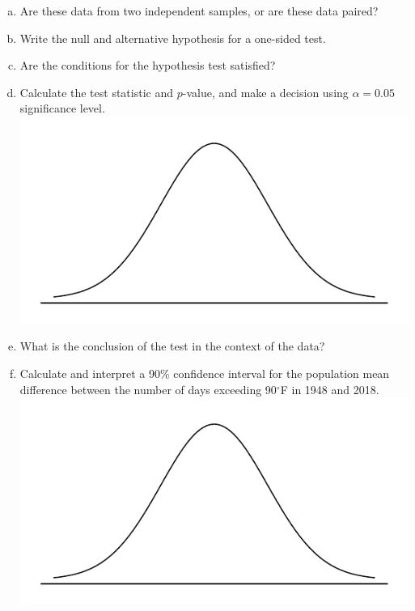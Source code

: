 \documentclass[fleqn, 11pt]{article}\usepackage[]{graphicx}\usepackage[]{color}
\begin{document}
\begin{enumerate}[(a)]
\item Are these data from two independent samples, or are these data paired?
\vspace{1cm}

\item Write the null and alternative hypothesis for a one-sided test.
\vspace{1cm}

\item Are the conditions for the hypothesis test satisfied?
\vspace{3cm}

\item Calculate the test statistic and $p$-value, and make a decision using $\alpha = 0.05$ significance level.\\
\includegraphics[scale = 0.5]{norm_draw.pdf}

\newpage
\item What is the conclusion of the test in the context of the data?
\vspace{4cm}

\item Calculate and interpret a 90\% confidence interval for the population mean difference between the number of days exceeding 90$^{\circ}$F in 1948 and 2018.\\
\includegraphics[scale = 0.55]{norm_draw.pdf}
\end{enumerate}
\end{document}
